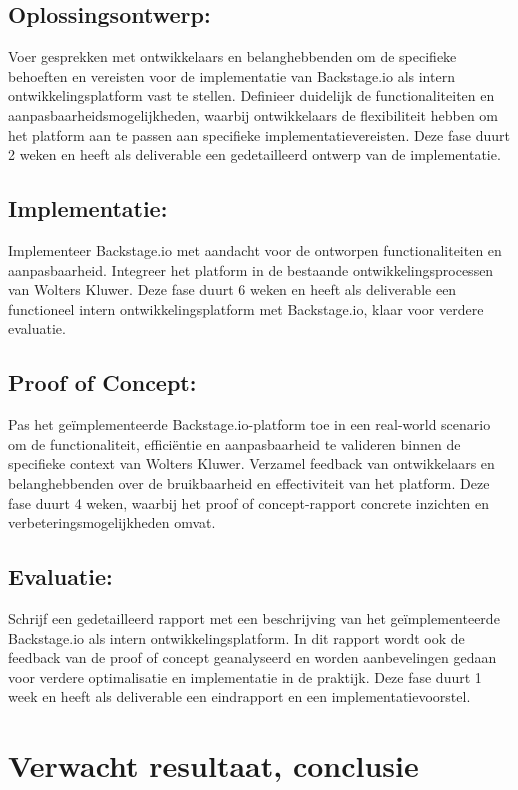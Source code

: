 \subsection{Oplossingsontwerp: }
Voer gesprekken met ontwikkelaars en belanghebbenden om de specifieke behoeften en vereisten voor de implementatie van Backstage.io als intern ontwikkelingsplatform vast te stellen. Definieer duidelijk de functionaliteiten en aanpasbaarheidsmogelijkheden, waarbij ontwikkelaars de flexibiliteit hebben om het platform aan te passen aan specifieke implementatievereisten. Deze fase duurt 2 weken en heeft als deliverable een gedetailleerd ontwerp van de implementatie.

\subsection{Implementatie:}
Implementeer Backstage.io met aandacht voor de ontworpen functionaliteiten en aanpasbaarheid. Integreer het platform in de bestaande ontwikkelingsprocessen van Wolters Kluwer. Deze fase duurt 6 weken en heeft als deliverable een functioneel intern ontwikkelingsplatform met Backstage.io, klaar voor verdere evaluatie.

\subsection{Proof of Concept:}
Pas het geïmplementeerde Backstage.io-platform toe in een real-world scenario om de functionaliteit, efficiëntie en aanpasbaarheid te valideren binnen de specifieke context van Wolters Kluwer. Verzamel feedback van ontwikkelaars en belanghebbenden over de bruikbaarheid en effectiviteit van het platform. Deze fase duurt 4 weken, waarbij het proof of concept-rapport concrete inzichten en verbeteringsmogelijkheden omvat.

\subsection{Evaluatie:}
Schrijf een gedetailleerd rapport met een beschrijving van het geïmplementeerde Backstage.io als intern ontwikkelingsplatform. In dit rapport wordt ook de feedback van de proof of concept geanalyseerd en worden aanbevelingen gedaan voor verdere optimalisatie en implementatie in de praktijk. Deze fase duurt 1 week en heeft als deliverable een eindrapport en een implementatievoorstel.

\section{Verwacht resultaat, conclusie}%
\label{sec:verwachte_resultaten}


